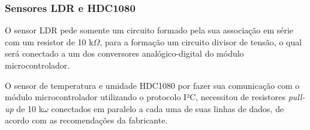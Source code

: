 



\subsubsection{Sensores LDR e HDC1080}

O sensor LDR pede somente um circuito formado pela sua associação em série com um resistor de 10 k$\Omega$, para a formação um circuito divisor de tensão, o qual será conectado a um dos conversores analógico-digital do módulo microcontrolador.

O sensor de temperatura e umidade HDC1080 por fazer sua comunicação com o módulo microcontrolador utilizando o protocolo I²C, necessitou de resistores \textit{pull-up} de 10 k$\omega$ conectados em paralelo a cada uma de suas linhas de dados, de acordo com as recomendações da fabricante.


